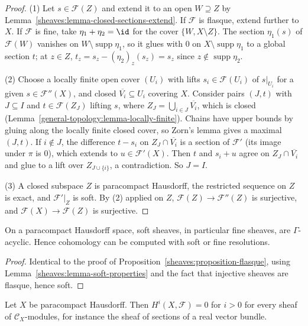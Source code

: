 \begin{proof}
(1) Let $s \in \mathcal{F}(Z)$ and extend it to an open $W \supseteq Z$ by Lemma~\ref{sheaves:lemma-closed-sections-extend}. If $\mathcal{F}$ is flasque, extend further to $X$. If
$\mathcal{F}$ is fine, take $\eta_1 + \eta_2 = \id$ for the cover $\{W, X \setminus Z\}$. The section $\eta_1(s)$ of $\mathcal{F}(W)$ vanishes on $W \setminus \operatorname{supp}\eta_1$, so it glues
with $0$ on $X \setminus \operatorname{supp}\eta_1$ to a global section $t$; at $z \in Z$, $t_z = s_z - (\eta_2)_z(s_z) = s_z$ since $z \notin \operatorname{supp}\eta_2$.

(2) Choose a locally finite open cover $(U_i)$ with lifts $s_i \in \mathcal{F}(U_i)$ of $s|_{U_i}$ for a given $s \in \mathcal{F}''(X)$, and closed $\overline{V_i} \subseteq U_i$ covering $X$. Consider pairs
$(J, t)$ with $J \subseteq I$ and $t \in \mathcal{F}(Z_J)$ lifting $s$, where $Z_J = \bigcup_{i \in J}\overline{V_i}$, which is closed (Lemma~\ref{general-topology:lemma-locally-finite}). Chains
have upper bounds by gluing along the locally finite closed cover, so Zorn's lemma gives a maximal $(J, t)$. If $i \notin J$, the difference $t - s_i$ on $Z_J \cap \overline{V_i}$ is a section of
$\mathcal{F}'$ (its image under $\pi$ is $0$), which extends to $u \in \mathcal{F}'(X)$. Then $t$ and $s_i + u$ agree on $Z_J \cap \overline{V_i}$ and glue to a lift over $Z_{J \cup \{i\}}$, a
contradiction. So $J = I$.

(3) A closed subspace $Z$ is paracompact Hausdorff, the restricted sequence on $Z$ is exact, and $\mathcal{F}'|_Z$ is soft. By (2) applied on $Z$, $\mathcal{F}(Z) \to \mathcal{F}''(Z)$ is surjective,
and $\mathcal{F}(X) \to \mathcal{F}(Z)$ is surjective.
\end{proof}

\begin{theorem}\label{sheaves:theorem-soft-acyclic}
On a paracompact Hausdorff space, soft sheaves, in particular fine sheaves, are $\Gamma$-acyclic. Hence cohomology can be computed with soft or fine resolutions.
\end{theorem}

\begin{proof}
Identical to the proof of Proposition~\ref{sheaves:proposition-flasque}, using Lemma~\ref{sheaves:lemma-soft-properties} and the fact that injective sheaves are
flasque, hence soft.
\end{proof}

\begin{corollary}\label{sheaves:corollary-fine-acyclic}
Let $X$ be paracompact Hausdorff. Then $H^i(X, \mathcal{F}) = 0$ for $i > 0$ for every sheaf of $\mathcal{C}_X$-modules, for instance the sheaf of sections of a real vector bundle.
\end{corollary}

